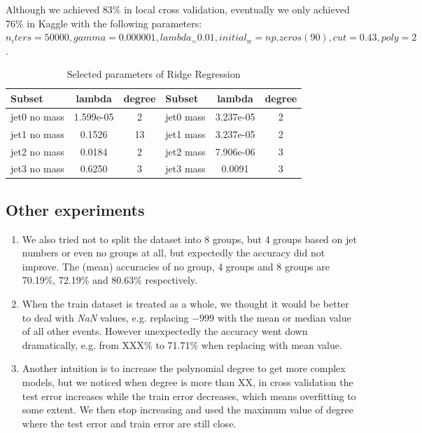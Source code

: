 \documentclass[10pt,conference,compsocconf]{IEEEtran}
\begin{document}
Although we achieved 83\% in local cross validation, eventually we only achieved 76\% in Kaggle with the following parameters: $n_iters = 50000, gamma = 0.000001, lambda_ = 0.01, initial_w = np.zeros(90), cut = 0.43, poly = 2$.

\begin{table}[htbp]
  \centering
  \begin{tabular}[c]{| l | c | c || l | c | c |}
    \hline
    Subset       & lambda & degree & Subset     & lambda      & degree \\
    \hline
    \hline 
    jet0 no mass & 1.599e-05  & 2  & jet0 mass  & 3.237e-05  & 2  \\
    jet1 no mass & 0.1526     & 13 & jet1 mass  & 3.237e-05  & 2  \\
    jet2 no mass & 0.0184     & 2  & jet2 mass  & 7.906e-06  & 3  \\
    jet3 no mass & 0.6250     & 3  & jet3 mass  & 0.0091     & 3  \\
    \hline
  \end{tabular}
  \caption{Selected parameters of Ridge Regression}
  \label{tab:param}
\end{table}

\subsection{Other experiments}
\begin{enumerate}
\item We also tried not to split the dataset into 8 groups, but 4 groups based on jet numbers or even no groups at all, but expectedly the accuracy did not improve. The (mean) accuracies of no group, 4 groups and 8 groups are 70.19\%, 72.19\% and 80.63\% respectively.
\item When the train dataset is treated as a whole, we thought it would be better to deal with \textit{NaN} values, e.g. replacing $-999$ with the mean or median value of all other events. However unexpectedly the accuracy went down dramatically, e.g. from XXX\% to 71.71\% when replacing with mean value.
\item Another intuition is to increase the polynomial degree to get more complex models, but we noticed when degree is more than {\color{red}XX}, in cross validation the test error increases while the train error decreases, which means overfitting to some extent. We then stop increasing and used the maximum value of degree where the test error and train error are still close. 
\end{enumerate}
\end{document}
